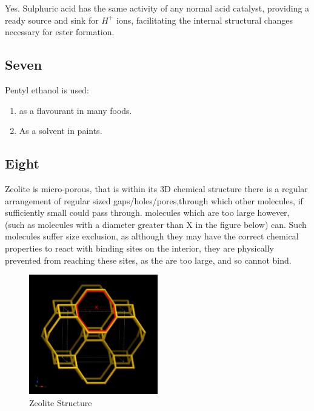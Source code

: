 \documentclass[]{article}
\begin{document}
Yes. Sulphuric acid has the same activity of any normal acid catalyst,
providing a ready source and sink for \(H^{+}\) ions, facilitating the
internal structural changes necessary for ester formation.

\hypertarget{seven}{%
\subsection{Seven}\label{seven}}

Pentyl ethanol is used:

\begin{enumerate}
\def\labelenumi{\arabic{enumi}.}
\item
  as a flavourant in many foods.
\item
  As a solvent in paints.
\end{enumerate}

\hypertarget{eight}{%
\subsection{Eight}\label{eight}}

Zeolite is micro-porous, that is within its 3D chemical structure there
is a regular arrangement of regular sized gaps/holes/pores,through which
other molecules, if sufficiently small could pass through. molecules
which are too large however, (such as molecules with a diameter greater
than X in the figure below) can. Such molecules suffer size exclusion,
as although they may have the correct chemical properties to react with
binding sites on the interior, they are physically prevented from
reaching these sites, as the are too large, and so cannot bind.

\begin{figure}
\centering
\includegraphics[width=0.5\textwidth,height=\textheight]{Images/ZeoliteStructure2.jpg}
\caption{Zeolite Structure}
\end{figure}
\end{document}
